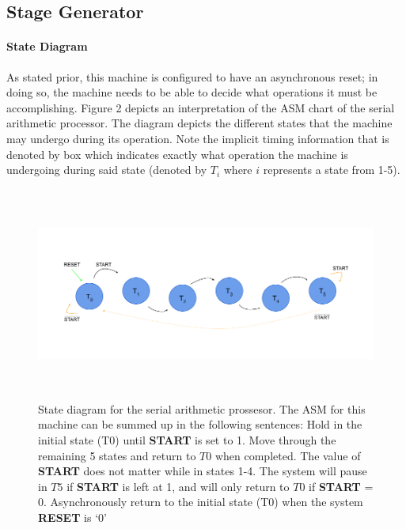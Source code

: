 \documentclass[11pt,a4paper,english]{article}
\begin{document}
%
\pagebreak
 
 \subsection*{Stage Generator}
  \paragraph*{State Diagram}
  As stated prior, this machine is configured to have an asynchronous reset; in doing so, the machine needs to be able to decide what operations it must be accomplishing. Figure 2 depicts an interpretation of the ASM chart of the serial arithmetic processor. The diagram depicts the different states that the machine may undergo during its operation. Note the implicit timing information that is denoted by box which indicates exactly what operation the machine is undergoing during said state (denoted by $T_i$ where $i$ represents a state from 1-5).
  \begin{figure}[!h]
    \centering
    \includegraphics[height=70mm]{ss/STATE_DIAGRAM.png}
    \caption{
      State diagram for the serial arithmetic prossesor. The ASM for this machine can be summed up in the following sentences:
      Hold in the initial state (T0) until \textbf{START} is set to 1. Move through the remaining 5 states and return to $T0$ when completed. The value of \textbf{START} does not matter while in states 1-4. The system will pause in $T5$ if \textbf{START} is left at 1, and will only return to $T0$ if \textbf{START} = 0. Asynchronously return to the initial state (T0) when the system \textbf{RESET} is ‘0’
    }
    \label{figure}
  \end{figure}
\end{document}
